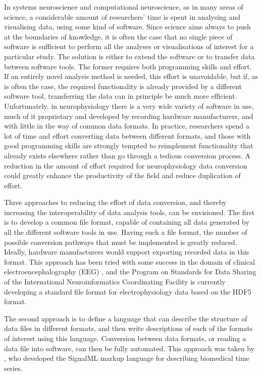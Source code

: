 \documentclass{frontiers}
\begin{document}
In systems neuroscience and computational neuroscience, as in many areas of science, a considerable amount of researchers' time is spent in analysing and visualising data, using some kind of software.
Since science aims always to push at the boundaries of knowledge, it is often the case that no single piece of software is sufficient to perform all the analyses or visualisations of interest for a particular study.
The solution is either to extend the software or to transfer data between software tools.
The former requires both programming skills and effort.
If an entirely novel analysis method is needed, this effort is unavoidable, but if, as is often the case, the required functionality is already provided by a different software tool, transferring the data can in principle be much more efficient.
Unfortunately, in neurophysiology there is a very wide variety of software in use, much of it proprietary and developed by recording hardware manufacturers, and with little in the way of common data formats.
In practice, researchers spend a lot of time and effort converting data between different formats, and those with good programming skills are strongly tempted to reimplement functionality that already exists elsewhere rather than go through a tedious conversion process.
A reduction in the amount of effort required for neurophysiology data conversion could greatly enhance the productivity of the field and reduce duplication of effort. 

Three approaches to reducing the effort of data conversion, and thereby increasing the interoperability of data analysis tools, can be envisioned.
The first is to develop a common file format, capable of containing all data generated by all the different software tools in use.
Having such a file format, the number of possible conversion pathways that must be implemented is greatly reduced.
Ideally, hardware manufacturers would support exporting recorded data in this format.
This approach has been tried with some success in the domain of clinical electroencephalography (EEG) \citep[The European Data Format, EDF;][]{Kemp1992, Kemp2003}, and the Program on Standards for Data Sharing of the International Neuroinformatics Coordinating Facility is currently developing a standard file format for electrophysiology data \citep{Teeters2013} based on the HDF5 format.

The second approach is to define a language that can describe the structure of data files in different formats, and then write descriptions of each of the formats of interest using this language.
Conversion between data formats, or reading a data file into software, can then be fully automated.
This approach was taken by \citet{Durka2004}, who developed the SignalML markup language for describing biomedical time series.
\end{document}
